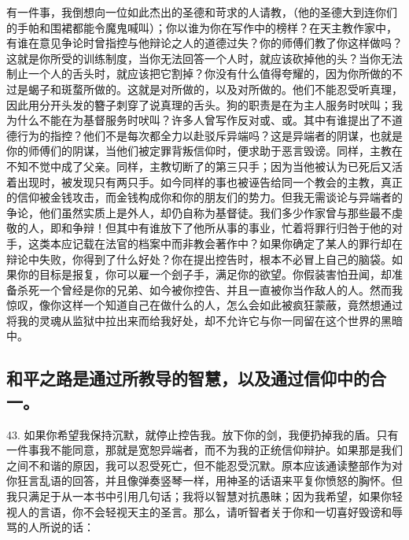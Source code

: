 有一件事，我倒想向一位如此杰出的圣德和苛求的人请教，（他的圣德大到连你们的手帕和围裙都能令魔鬼喊叫）；你以谁为你在写作中的榜样？在天主教作家中，有谁在意见争论时曾指控与他辩论之人的道德过失？你的师傅们教了你这样做吗？这就是你所受的训练制度，当你无法回答一个人时，就应该砍掉他的头？当你无法制止一个人的舌头时，就应该把它割掉？你没有什么值得夸耀的，因为你所做的不过是蝎子和斑蝥所做的。这就是对所做的，以及对所做的。他们不能忍受听真理，因此用分开头发的簪子刺穿了说真理的舌头。狗的职责是在为主人服务时吠叫；我为什么不能在为基督服务时吠叫？许多人曾写作反对或、或。其中有谁提出了不道德行为的指控？他们不是每次都全力以赴驳斥异端吗？这是异端者的阴谋，也就是你的师傅们的阴谋，当他们被定罪背叛信仰时，便求助于恶言毁谤。同样，主教在不知不觉中成了父亲。同样，主教切断了的第三只手；因为当他被认为已死后又活着出现时，被发现只有两只手。如今同样的事也被诬告给同一个教会的主教，真正的信仰被金钱攻击，而金钱构成你和你的朋友们的势力。但我无需谈论与异端者的争论，他们虽然实质上是外人，却仍自称为基督徒。我们多少作家曾与那些最不虔敬的人，即和争辩！但其中有谁放下了他所从事的事业，忙着将罪行归咎于他的对手，这类本应记载在法官的档案中而非教会著作中？如果你确定了某人的罪行却在辩论中失败，你得到了什么好处？你在提出控告时，根本不必冒上自己的脑袋。如果你的目标是报复，你可以雇一个刽子手，满足你的欲望。你假装害怕丑闻，却准备杀死一个曾经是你的兄弟、如今被你控告、并且一直被你当作敌人的人。然而我惊叹，像你这样一个知道自己在做什么的人，怎么会如此被疯狂蒙蔽，竟然想通过将我的灵魂从监狱中拉出来而给我好处，却不允许它与你一同留在这个世界的黑暗中。\par


\subsection{和平之路是通过所教导的智慧，以及通过信仰中的合一。}

43. 如果你希望我保持沉默，就停止控告我。放下你的剑，我便扔掉我的盾。只有一件事我不能同意，那就是宽恕异端者，而不为我的正统信仰辩护。如果那是我们之间不和谐的原因，我可以忍受死亡，但不能忍受沉默。原本应该通读整部作为对你狂言乱语的回答，并且像弹奏竖琴一样，用神圣的话语来平复你愤怒的胸怀。但我只满足于从一本书中引用几句话；我将以智慧对抗愚昧；因为我希望，如果你轻视人的言语，你不会轻视天主的圣言。那么，请听智者关于你和一切喜好毁谤和辱骂的人所说的话：\par

